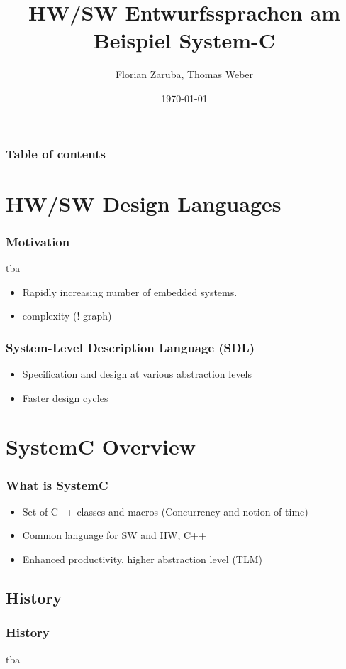 \documentclass{beamer}
\begin{document}
\title[Entwurssprachen]{HW/SW Entwurfssprachen am Beispiel System-C}
\author[Zaruba F., Weber T.]{Florian Zaruba, Thomas Weber}
\date{\today} 

\begin{frame}
\titlepage
\end{frame}

\begin{frame}\frametitle{Table of contents}
  \tableofcontents
\end{frame}


\section{HW/SW Design Languages} 

\begin{frame}\frametitle{Motivation} 
tba
\begin{itemize}
	\item Rapidly increasing number of embedded systems.
	\item complexity (! graph)
\end{itemize}
\end{frame}

\begin{frame}\frametitle{System-Level Description Language (SDL)} 
\begin{itemize}
	\item Specification and design at various abstraction levels
	\item Faster design cycles %
\end{itemize}
\end{frame}

\section{SystemC Overview}
\begin{frame}\frametitle{What is SystemC}
\begin{itemize}
	\item Set of C++ classes and macros (Concurrency and notion of time)
	\item Common language for SW and HW, C++
	\item Enhanced productivity, higher abstraction level (TLM)
\end{itemize}
\end{frame}

\subsection{History}
\begin{frame}\frametitle{History} 
tba
\end{frame}
\end{document}
